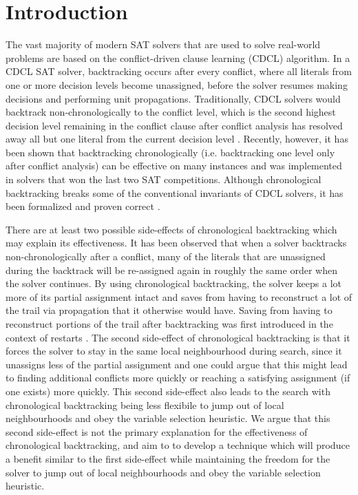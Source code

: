 \documentclass{article}
\begin{document}
\begin{abstract}
\end{abstract}

\section{Introduction}
The vast majority of modern SAT solvers that are used to solve real-world problems are based on the conflict-driven clause learning (CDCL) algorithm. In a CDCL SAT solver, backtracking occurs after every conflict, where all literals from one or more decision levels become unassigned, before the solver resumes making decisions and performing unit propagations. Traditionally, CDCL solvers would backtrack non-chronologically to the conflict level, which is the second highest decision level remaining in the conflict clause after conflict analysis has resolved away all but one literal from the current decision level \cite{DBLP:conf/dac/MoskewiczMZZM01}. Recently, however, it has been shown that backtracking chronologically (i.e. backtracking one level only after conflict analysis) \cite{DBLP:conf/lpar/2013, DBLP:conf/sat/NadelR18} can be effective on many instances and was implemented in solvers that won the last two SAT competitions. Although chronological backtracking breaks some of the conventional invariants of CDCL solvers, it has been formalized and proven correct \cite{DBLP:conf/sat/MohleB19}.

There are at least two possible side-effects of chronological backtracking which may explain its effectiveness. It has been observed that when a solver backtracks non-chronologically after a conflict, many of the literals that are unassigned during the backtrack will be re-assigned again in roughly the same order when the solver continues. By using chronological backtracking, the solver keeps a lot more of its partial assignment intact and saves from having to reconstruct a lot of the trail via propagation that it otherwise would have. Saving from having to reconstruct portions of the trail after backtracking was first introduced in the context of restarts \cite{DBLP:journals/jsat/TakRH11}. The second side-effect of chronological backtracking is that it forces the solver to stay in the same local neighbourhood during search, since it unassigns less of the partial assignment and one could argue that this might lead to finding additional conflicts more quickly or reaching a satisfying assignment (if one exists) more quickly. This second side-effect also leads to the search with chronological backtracking being less flexibile to jump out of local neighbourhoods and obey the variable selection heuristic. We argue that this second side-effect is not the primary explanation for the effectiveness of chronological backtracking, and aim to to develop a technique which will produce a benefit similar to the first side-effect while maintaining the freedom for the solver to jump out of local neighbourhoods and obey the variable selection heuristic.
\end{document}
